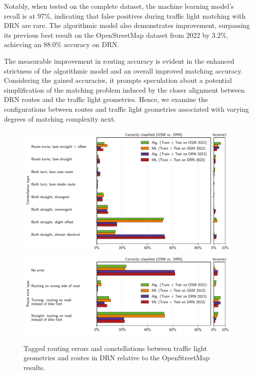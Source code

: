 Notably, when tested on the complete dataset, the machine learning model's recall is at 97\%, indicating that false positives during traffic light matching with DRN are rare. The algorithmic model also demonstrates improvement, surpassing its previous best result on the OpenStreetMap dataset from 2022 by 3.2\%, achieving an 88.0\% accuracy on DRN. 

The measurable improvement in routing accuracy is evident in the enhanced strictness of the algorithmic model and an overall improved matching accuracy. Considering the gained accuracies, it prompts speculation about a potential simplification of the matching problem induced by the closer alignment between DRN routes and the traffic light geometries. Hence, we examine the configurations between routes and traffic light geometries associated with varying degrees of matching complexity next.

\begin{figure}[!t]
\centering 
\includegraphics[width=\linewidth]{images/matching-constellations-osm-vs-drn.pdf} \\
\includegraphics[width=\linewidth]{images/matching-route-errors-osm-vs-drn.pdf}
\caption{Tagged routing errors and constellations between traffic light geometries and routes in DRN relative to the OpenStreetMap results.}
\label{fig:matching-constellations-osm-vs-drn}
\end{figure}

